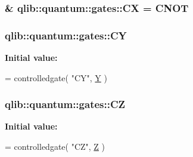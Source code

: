 \subsubsection[{\texorpdfstring{CX}{CX}}]{\& qlib\+::quantum\+::gates\+::\+CX = {\bf C\+N\+OT}}\hypertarget{namespaceqlib_1_1quantum_1_1gates_a932ac3dc30dfbfc065ef01b99b9f0ae1}{}\label{namespaceqlib_1_1quantum_1_1gates_a932ac3dc30dfbfc065ef01b99b9f0ae1}
\subsubsection[{\texorpdfstring{CY}{CY}}]{ qlib\+::quantum\+::gates\+::\+CY}\hypertarget{namespaceqlib_1_1quantum_1_1gates_afb32e9584e5434c3bff9087fe762ca9e}{}\label{namespaceqlib_1_1quantum_1_1gates_afb32e9584e5434c3bff9087fe762ca9e}
{\bfseries Initial value\+:}
\begin{DoxyCode}
= controlledgate(
    \textcolor{stringliteral}{"CY"}, 
    \hyperlink{namespaceqlib_1_1quantum_1_1gates_a7d495b8ebaa4b3a3f73a871bc993e82b}{Y}
    )
\end{DoxyCode}
\subsubsection[{\texorpdfstring{CZ}{CZ}}]{ qlib\+::quantum\+::gates\+::\+CZ}\hypertarget{namespaceqlib_1_1quantum_1_1gates_adaffb7ef8207f26d42d8756b38a61fe8}{}\label{namespaceqlib_1_1quantum_1_1gates_adaffb7ef8207f26d42d8756b38a61fe8}
{\bfseries Initial value\+:}
\begin{DoxyCode}
= controlledgate(
    \textcolor{stringliteral}{"CZ"}, 
    \hyperlink{namespaceqlib_1_1quantum_1_1gates_ad07d8c867d0463c3f66dfa80d5b6b53c}{Z}
    )
\end{DoxyCode}
